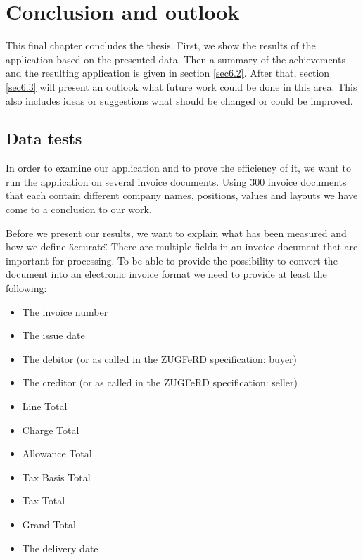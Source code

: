 %
% 
\chapter{Conclusion and outlook}
\label{cha6}

This final chapter concludes the thesis. First, we show the results of the application based on the presented data. Then a summary of the achievements and the resulting application is given in section \ref{sec6.2}. After that, section \ref{sec6.3} will present an outlook what future work could be done in this area. This also includes ideas or suggestions what should be changed or could be improved.

\section{Data tests}
In order to examine our application and to prove the efficiency of it, we want to run the application on several invoice documents. Using 300 invoice documents that each contain different company names, positions, values and layouts we have come to a conclusion to our work.

Before we present our results, we want to explain what has been measured and how we define \"accurate\".
There are multiple fields in an invoice document that are important for processing. To be able to provide the possibility to convert the document into an electronic invoice format we need to provide at least the following:
\begin{itemize}
\itemsep -1em 
	\item The invoice number
	\item The issue date
	\item The debitor (or as called in the ZUGFeRD specification: buyer)
	\item The creditor (or as called in the ZUGFeRD specification: seller)
	\item Line Total
	\item Charge Total
	\item Allowance Total
	\item Tax Basis Total
	\item Tax Total
	\item Grand Total
	\item The delivery date
\end{itemize}

